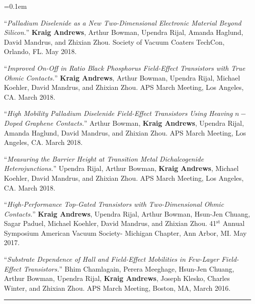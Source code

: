 \documentclass[10pt,letterpaper]{article}
\begin{document}
\begin{enumerate*}
	\parskip=0.1em
	\item ``\emph{Palladium Diselenide as a New Two-Dimensional Electronic Material Beyond Silicon.}'' 
	\textbf{Kraig Andrews}, Arthur Bowman, Upendra Rijal, Amanda Haglund, David Mandrus, and Zhixian Zhou.
	Society of Vacuum Coaters TechCon, Orlando, FL. May 2018.

	\bigskip

	\item ``\emph{Improved On-Off in Ratio Black Phosphorus Field-Effect Transistors with True Ohmic Contacts.}''  
	\textbf{Kraig Andrews}, Arthur Bowman, Upendra Rijal, Michael Koehler, David Mandrus, and Zhixian Zhou. 
	APS March Meeting, Los Angeles, CA. March 2018.

	\bigskip

	\item ``\emph{High Mobility Palladium Diselenide Field-Effect Transistors Using Heaving $n-$Doped Graphene Contacts.}''
	Arthur Bowman, \textbf{Kraig Andrews}, Upendra Rijal, Amanda Haglund, David Mandrus, and Zhixian Zhou.
	APS March Meeting, Los Angeles, CA. March 2018.

	\bigskip

	\item ``\emph{Measuring the Barrier Height at Transition Metal Dichalcogenide Heterojunctions.}''
	Upendra Rijal, Arthur Bowman, \textbf{Kraig Andrews}, Michael Koehler, David Mandrus, and Zhixian Zhou.
	APS March Meeting, Los Angeles, CA. March 2018.

	\bigskip

	\item ``\emph{High-Performance Top-Gated  Transistors with Two-Dimensional Ohmic Contacts.}''
	\textbf{Kraig Andrews}, Upendra Rijal, Arthur Bowman, Hsun-Jen Chuang, Sagar Paduel, Michael Koehler, David Mandrus, and Zhixian Zhou.
	41$^\mathrm{st}$ Annual Symposium American Vacuum Society- Michigan Chapter, Ann Arbor, MI. May 2017.

	\bigskip

	\item ``\emph{Substrate Dependence of Hall and Field-Effect Mobilities in Few-Layer  Field-Effect Transistors.}''
	Bhim Chamlagain, Perera Meeghage, Hsun-Jen Chuang, Arthur Bowman, Upendra Rijal, \textbf{Kraig Andrews}, Joseph Klesko,
	Charles Winter, and Zhixian Zhou. APS March Meeting, Boston, MA, March 2016.
\end{enumerate*}

\hrule
\vspace{-0.4em}
\end{document}

